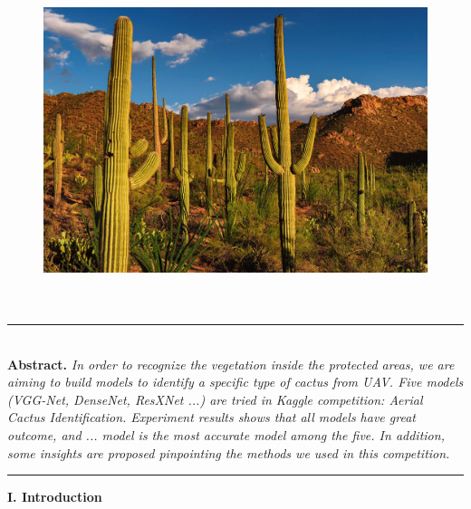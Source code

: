 \documentclass[a4paper]{article}
\newcommand{\HRule}{\rule{\linewidth}{0.5mm}}
\begin{document}
\begin{figure}[H]
\centering
\includegraphics[width=15cm,height=9.8cm]{cactus.png}
\end{figure}

\noindent \HRule
\vspace{2.5mm} \\
\large{\textbf{Abstract. }\emph{In order to recognize the vegetation inside the protected areas, we are aiming to build models to identify a specific type of cactus from UAV. Five models (\textsf{VGG-Net, DenseNet, ResXNet ...}) are tried in \emph{Kaggle competition: Aerial Cactus Identification}. Experiment results shows that all models have great outcome, and ... model is the most accurate model among the five. In addition, some insights are proposed pinpointing the methods we used in this competition. \\ }}
\vspace{2mm}
\HRule

\vspace{6mm}
\begin{center}
\LARGE\textbf{I. Introduction} \\
\end{center}
\vspace{2mm}
\end{document}
